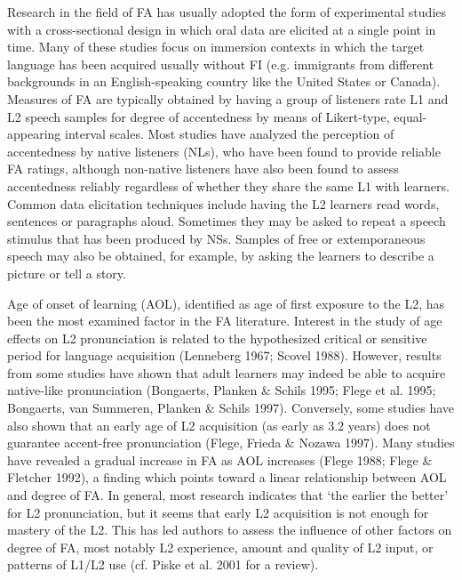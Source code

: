 \documentclass[12pt]{article}
\newenvironment{styleStandard}{\setlength\leftskip{0cm}\setlength\rightskip{0cm plus 1fil}\setlength\parindent{0cm}\setlength\parfillskip{0pt plus 1fil}\setlength\parskip{0in plus 1pt}\writerlistparindent\writerlistleftskip\leavevmode\normalfont\normalsize\writerlistlabel\ignorespaces}{\unskip\vspace{0.111in plus 0.0111in}\par}
\newcommand\writerlistleftskip{}
\newcommand\writerlistparindent{}
\newcommand\writerlistlabel{}
\begin{document}
\begin{styleStandard}
Research in the field of FA has usually adopted the form of experimental studies with a cross-sectional design in which oral data are elicited at a single point in time. Many of these studies focus on immersion contexts in which the target language has been acquired usually without FI (e.g. immigrants from different backgrounds in an English-speaking country like the United States or Canada). Measures of FA are typically obtained by having a group of listeners rate L1 and L2 speech samples for degree of accentedness by means of Likert-type, equal-appearing interval scales. Most studies have analyzed the perception of accentedness by native listeners (NLs), who have been found to provide reliable FA ratings, although non-native listeners have also been found to assess accentedness reliably regardless of whether they share the same L1 with learners. Common data elicitation techniques include having the L2 learners read words, sentences or paragraphs aloud. Sometimes they may be asked to repeat a speech stimulus that has been produced by NSs. Samples of free or extemporaneous speech may also be obtained, for example, by asking the learners to describe a picture or tell a story. 
\end{styleStandard}

\begin{styleStandard}
Age of onset of learning (AOL), identified as age of first exposure to the L2, has been the most examined factor in the FA literature. Interest in the study of age effects on L2 pronunciation is related to the hypothesized critical or sensitive period for language acquisition (Lenneberg 1967; Scovel 1988). However, results from some studies have shown that adult learners may indeed be able to acquire native-like pronunciation (Bongaerts, Planken \& Schils 1995; Flege et al. 1995; Bongaerts, van Summeren, Planken \& Schils 1997). Conversely, some studies have also shown that an early age of L2 acquisition (as early as 3.2 years) does not guarantee accent-free pronunciation (Flege, Frieda \& Nozawa 1997). Many studies have revealed a gradual increase in FA as AOL increases (Flege 1988; Flege \& Fletcher 1992), a finding which points toward a linear relationship between AOL and degree of FA. In general, most research indicates that ‘the earlier the better’ for L2 pronunciation, but it seems that early L2 acquisition is not enough for mastery of the L2. This has led authors to assess the influence of other factors on degree of FA, most notably L2 experience, amount and quality of L2 input, or patterns of L1/L2 use (cf. Piske et al. 2001 for a review). 
\end{styleStandard}
\end{document}
